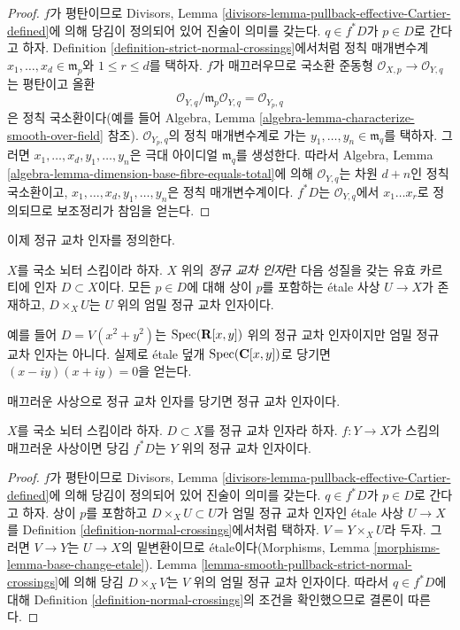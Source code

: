 \begin{proof}
$f$가 평탄이므로 Divisors, Lemma
\ref{divisors-lemma-pullback-effective-Cartier-defined}에 의해
당김이 정의되어 있어 진술이 의미를 갖는다.
$q \in f^*D$가 $p \in D$로 간다고 하자.
Definition \ref{definition-strict-normal-crossings}에서처럼
정칙 매개변수계 $x_1, \ldots, x_d \in \mathfrak m_p$와
$1 \leq r \leq d$를 택하자. $f$가 매끄러우므로 국소환 준동형
$\mathcal{O}_{X, p} \to \mathcal{O}_{Y, q}$는 평탄이고 올환
$$
\mathcal{O}_{Y, q}/\mathfrak m_p \mathcal{O}_{Y, q} =
\mathcal{O}_{Y_p, q}
$$
은 정칙 국소환이다(예를 들어 Algebra, Lemma
\ref{algebra-lemma-characterize-smooth-over-field} 참조).
$\mathcal{O}_{Y_p, q}$의 정칙 매개변수계로 가는
$y_1, \ldots, y_n \in \mathfrak m_q$를 택하자.
그러면 $x_1, \ldots, x_d, y_1, \ldots, y_n$은 극대 아이디얼
$\mathfrak m_q$를 생성한다. 따라서 Algebra, Lemma
\ref{algebra-lemma-dimension-base-fibre-equals-total}에 의해
$\mathcal{O}_{Y, q}$는 차원 $d + n$인 정칙 국소환이고,
$x_1, \ldots, x_d, y_1, \ldots, y_n$은 정칙 매개변수계이다.
$f^*D$는 $\mathcal{O}_{Y, q}$에서 $x_1 \ldots x_r$로 정의되므로
보조정리가 참임을 얻는다.
\end{proof}

\noindent
이제 정규 교차 인자를 정의한다.

\begin{definition}
\label{definition-normal-crossings}
$X$를 국소 뇌터 스킴이라 하자. $X$ 위의 {\it 정규 교차 인자}란
다음 성질을 갖는 유효 카르티에 인자 $D \subset X$이다.
모든 $p \in D$에 대해 상이 $p$를 포함하는 \'etale 사상
$U \to X$가 존재하고, $D \times_X U$는 $U$ 위의
엄밀 정규 교차 인자이다.
\end{definition}

\noindent
예를 들어 $D = V(x^2 + y^2)$는 $\mathop{\mathrm{Spec}}(\mathbf{R}[x, y])$ 위의
정규 교차 인자이지만 엄밀 정규 교차 인자는 아니다.
실제로 \'etale 덮개 $\mathop{\mathrm{Spec}}(\mathbf{C}[x, y])$로 당기면
$(x - iy)(x + iy) = 0$을 얻는다.

\begin{lemma}
\label{lemma-smooth-pullback-normal-crossings}
\begin{slogan}
매끄러운 사상으로 정규 교차 인자를 당기면 정규 교차 인자이다.
\end{slogan}
$X$를 국소 뇌터 스킴이라 하자. $D \subset X$를 정규 교차 인자라 하자.
$f : Y \to X$가 스킴의 매끄러운 사상이면 당김 $f^*D$는
$Y$ 위의 정규 교차 인자이다.
\end{lemma}

\begin{proof}
$f$가 평탄이므로 Divisors, Lemma
\ref{divisors-lemma-pullback-effective-Cartier-defined}에 의해
당김이 정의되어 있어 진술이 의미를 갖는다.
$q \in f^*D$가 $p \in D$로 간다고 하자.
상이 $p$를 포함하고 $D \times_X U \subset U$가 엄밀 정규 교차 인자인
\'etale 사상 $U \to X$를 Definition
\ref{definition-normal-crossings}에서처럼 택하자.
$V = Y \times_X U$라 두자. 그러면 $V \to Y$는 $U \to X$의
밑변환이므로 \'etale이다(Morphisms, Lemma
\ref{morphisms-lemma-base-change-etale}).
Lemma \ref{lemma-smooth-pullback-strict-normal-crossings}에 의해
당김 $D \times_X V$는 $V$ 위의 엄밀 정규 교차 인자이다.
따라서 $q \in f^*D$에 대해 Definition
\ref{definition-normal-crossings}의 조건을 확인했으므로 결론이 따른다.
\end{proof}

